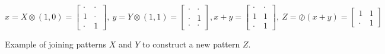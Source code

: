 \small
$$
x = X\otimes (1,0) =
\begin{bmatrix}
\cdot & \cdot \\[-.2em]
1 & \cdot \\[-.2em]
\cdot & 1
\end{bmatrix}\!\!, \
y = Y\otimes (1,1) =
\begin{bmatrix}
\cdot & \cdot \\[-.2em]
\cdot & 1 \\[-.2em]
\cdot & \cdot
\end{bmatrix}\!\!,
x + y =
\begin{bmatrix}
\cdot & \cdot \\[-.2em]
1 & 1 \\[-.2em]
\cdot & 1
\end{bmatrix}\!\!, \
Z = \oslash(x+y)=
\begin{bmatrix}
1 & 1 \\[-.2em]
\cdot & 1
\end{bmatrix}\!\!
$$
\caption{Example of joining patterns $X$ and $Y$ to construct a new pattern $Z$.}

